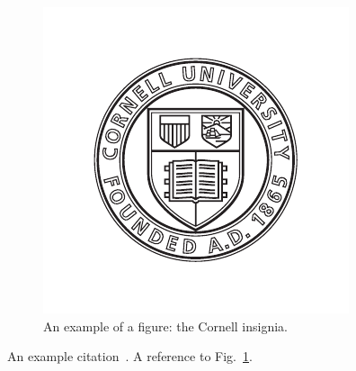 \documentclass[letterpaper, 12pt, extrafontsizes, oneside]{memoir}
\begin{document}
\begin{figure}
 \includegraphics[width=\linewidth]{cu-insignia-black}
 \caption[An example figure]{
  An example of a figure: the Cornell insignia.
 }\label{fig:figure}
\end{figure}

An example citation~\citep{PhysRev.73.803}.  A reference to Fig.~\ref{fig:figure}.


\cleardoublepage


\backmatter

\SingleSpacing
\setlength{\bibsep}{2\baselineskip}

\end{document}
